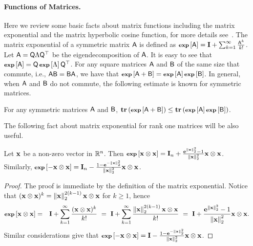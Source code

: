 \paragraph{Functions of Matrices.}
Here we review some basic facts about matrix functions including the matrix exponential and the matrix hyperbolic cosine function, for more details see~\cite{book:Higham:Matrix_fcn}. The matrix exponential of a symmetric matrix $\matA$ is defined as $\expm{\matA} = \Id + \sum_{k=1}^{\infty} \frac{\matA^k}{k!}$. Let $\matA=\matQ\Lambda \matQ^\top$ be the eigendecomposition of $\matA$. It is easy to see that $\expm{\matA} = \matQ \expm{\Lambda} \matQ^\top$. For any square matrices $\matA$ and $\matB$ of the same size that commute, i.e., $\matA\matB=\matB\matA$, we have that $ \expm{\matA+\matB} = \expm{\matA}\expm{\matB}$. In general, when $\matA$ and $\matB$ do not commute, the following estimate is known for symmetric matrices.
\begin{lemma}\cite{ineq:trace_exp:Golden,ineq:trace_exp:Thompson}\label{lem:ineq:golden_thompson}
For any symmetric matrices $\matA$ and $\matB$, $\trace{\expm{ \matA + \matB}} \leq \trace{\expm{\matA}\expm{\matB}}$.
\end{lemma}
The following fact about matrix exponential for rank one matrices will be also useful.
\begin{lemma}\label{lem:expm:outerprod}
	Let $\x$ be a non-zero vector in $\reals^n$. Then $ \expm{\x \otimes \x} = \Id_n + \frac{\e^{\norm{\x}^2} - 1}{\norm{\x}^2} \x\otimes \x$.
Similarly, $\expm{-\x \otimes \x} = \Id_n - \frac{1 - \e^{-\norm{\x}^2}}{\norm{\x}^2} \x \otimes \x$.
\end{lemma}
\begin{proof}
The proof is immediate by the definition of the matrix exponential. Notice that $(\x \otimes \x)^k = \norm{\x}^{2(k-1)} \x\otimes \x$ for $k\geq 1$, hence
\begin{eqnarray*}
		\expm{\x \otimes \x}  & = & \Id + \sum_{k=1}^{\infty}{ \frac{(\x \otimes \x)^k}{k!}} \  =\  \Id + \sum_{k=1}^{\infty}{ \frac{\norm{\x}^{2(k-1)} \x\otimes \x}{k!}}
				\ = \ \Id + \frac{\e^{\norm{\x}^2} - 1}{\norm{\x}^2} \x\otimes \x.
\end{eqnarray*}
Similar considerations give that $\expm{-\x\otimes \x } = \Id - \frac{1 - \e^{-\norm{\x}^2}}{\norm{\x}^2} \x \otimes \x$.
\end{proof}
%

